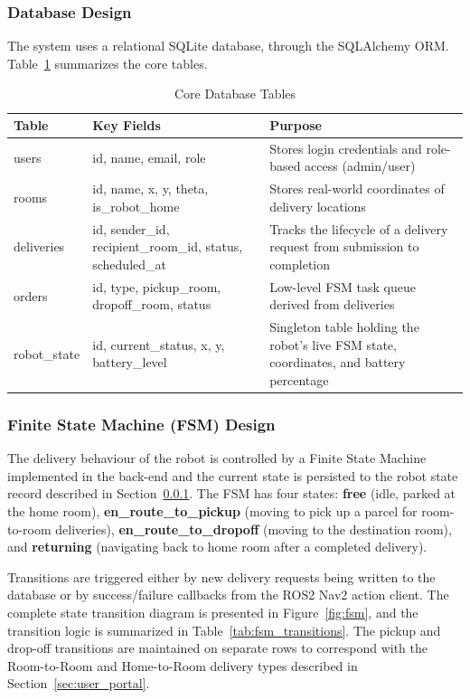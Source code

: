 \subsubsection{Database Design}
\label{sec:db_design}

The system uses a relational SQLite database, through the SQLAlchemy ORM. Table~\ref{tab:db_schema} summarizes the core tables.

\begin{table}[H]
	\centering
	\caption{Core Database Tables}
	\label{tab:db_schema}
	\begin{tabular}{|p{2.5cm}|p{5cm}|p{6cm}|}
		\hline
		\textbf{Table} & \textbf{Key Fields} & \textbf{Purpose} \\
		\hline
		users & id, name, email, role & Stores login credentials and role-based access (admin/user) \\
		\hline
		rooms & id, name, x, y, theta, is\_robot\_home & Stores real-world coordinates of delivery locations \\
		\hline
		deliveries & id, sender\_id, recipient\_room\_id, status, scheduled\_at & Tracks the lifecycle of a delivery request from submission to completion \\
		\hline
		orders & id, type, pickup\_room, dropoff\_room, status & Low-level FSM task queue derived from deliveries \\
		\hline
		robot\_state & id, current\_status, x, y, battery\_level & Singleton table holding the robot's live FSM state, coordinates, and battery percentage \\
		\hline
	\end{tabular}
\end{table}

\subsubsection{Finite State Machine (FSM) Design}
\label{sec:fsm_design}

The delivery behaviour of the robot is controlled by a Finite State Machine implemented in the back-end and the current state is persisted to the robot state record described in Section~\ref{sec:db_design}. The FSM has four states: \textbf{free} (idle, parked at the home room), \textbf{en\_route\_to\_pickup} (moving to pick up a parcel for room-to-room deliveries), \textbf{en\_route\_to\_dropoff} (moving to the destination room), and \textbf{returning} (navigating back to home room after a completed delivery).

Transitions are triggered either by new delivery requests being written to the database or by success/failure callbacks from the ROS2 Nav2 action client. The complete state transition diagram is presented in Figure~\ref{fig:fsm}, and the transition logic is summarized in Table~\ref{tab:fsm_transitions}. The pickup and drop-off transitions are maintained on separate rows to correspond with the Room-to-Room and Home-to-Room delivery types described in Section~\ref{sec:user_portal}.

